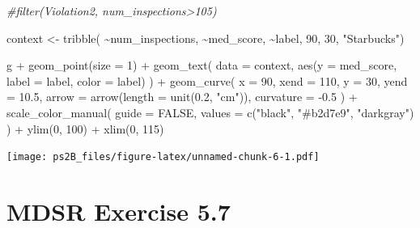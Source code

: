\documentclass[
]{article}
\newenvironment{Shaded}{\begin{snugshade}}{\end{snugshade}}
\newcommand{\AttributeTok}[1]{\textcolor[rgb]{0.77,0.63,0.00}{#1}}
\newcommand{\CommentTok}[1]{\textcolor[rgb]{0.56,0.35,0.01}{\textit{#1}}}
\newcommand{\ConstantTok}[1]{\textcolor[rgb]{0.00,0.00,0.00}{#1}}
\newcommand{\DecValTok}[1]{\textcolor[rgb]{0.00,0.00,0.81}{#1}}
\newcommand{\FloatTok}[1]{\textcolor[rgb]{0.00,0.00,0.81}{#1}}
\newcommand{\FunctionTok}[1]{\textcolor[rgb]{0.00,0.00,0.00}{#1}}
\newcommand{\NormalTok}[1]{#1}
\newcommand{\OtherTok}[1]{\textcolor[rgb]{0.56,0.35,0.01}{#1}}
\newcommand{\SpecialCharTok}[1]{\textcolor[rgb]{0.00,0.00,0.00}{#1}}
\newcommand{\StringTok}[1]{\textcolor[rgb]{0.31,0.60,0.02}{#1}}
\begin{document}
\begin{Shaded}
\begin{Highlighting}[]
\CommentTok{\#filter(Violation2, num\_inspections\textgreater{}105)}

\NormalTok{context }\OtherTok{\textless{}{-}} \FunctionTok{tribble}\NormalTok{(}
  \SpecialCharTok{\textasciitilde{}}\NormalTok{num\_inspections, }\SpecialCharTok{\textasciitilde{}}\NormalTok{med\_score, }\SpecialCharTok{\textasciitilde{}}\NormalTok{label,}
  \DecValTok{90}\NormalTok{, }\DecValTok{30}\NormalTok{, }\StringTok{"Starbucks"}\NormalTok{)}

\NormalTok{g }\SpecialCharTok{+} \FunctionTok{geom\_point}\NormalTok{(}\AttributeTok{size =} \DecValTok{1}\NormalTok{) }\SpecialCharTok{+}
  \FunctionTok{geom\_text}\NormalTok{(}
    \AttributeTok{data =}\NormalTok{ context, }
    \FunctionTok{aes}\NormalTok{(}\AttributeTok{y =}\NormalTok{ med\_score, }\AttributeTok{label =}\NormalTok{ label, }\AttributeTok{color =}\NormalTok{ label)}
\NormalTok{  ) }\SpecialCharTok{+} 
  \FunctionTok{geom\_curve}\NormalTok{(}
    \AttributeTok{x =} \DecValTok{90}\NormalTok{, }\AttributeTok{xend =} \DecValTok{110}\NormalTok{, }\AttributeTok{y =} \DecValTok{30}\NormalTok{, }\AttributeTok{yend =} \FloatTok{10.5}\NormalTok{, }
    \AttributeTok{arrow =} \FunctionTok{arrow}\NormalTok{(}\AttributeTok{length =} \FunctionTok{unit}\NormalTok{(}\FloatTok{0.2}\NormalTok{, }\StringTok{"cm"}\NormalTok{)), }\AttributeTok{curvature =} \SpecialCharTok{{-}}\FloatTok{0.5}
\NormalTok{  ) }\SpecialCharTok{+} 
  \FunctionTok{scale\_color\_manual}\NormalTok{(}
    \AttributeTok{guide =} \ConstantTok{FALSE}\NormalTok{, }
    \AttributeTok{values =} \FunctionTok{c}\NormalTok{(}\StringTok{"black"}\NormalTok{, }\StringTok{"\#b2d7e9"}\NormalTok{, }\StringTok{"darkgray"}\NormalTok{)}
\NormalTok{  ) }\SpecialCharTok{+} 
  \FunctionTok{ylim}\NormalTok{(}\DecValTok{0}\NormalTok{, }\DecValTok{100}\NormalTok{) }\SpecialCharTok{+} \FunctionTok{xlim}\NormalTok{(}\DecValTok{0}\NormalTok{, }\DecValTok{115}\NormalTok{)}
\end{Highlighting}
\end{Shaded}

\texttt{[image: ps2B\_files/figure-latex/unnamed-chunk-6-1.pdf]}

\newpage

\hypertarget{mdsr-exercise-5.7}{%
\section{MDSR Exercise 5.7}\label{mdsr-exercise-5.7}}
\end{document}
